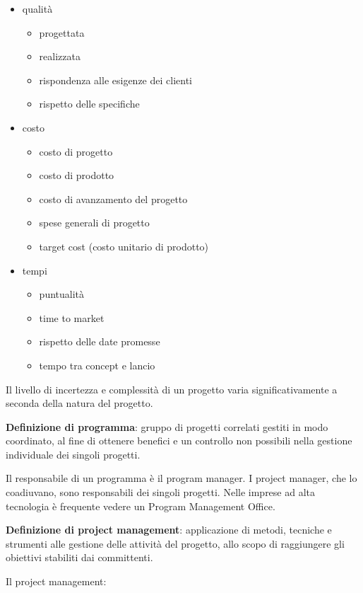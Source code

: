 \documentclass[answers, a4paper, 11pt]{exam}
\begin{document}
\begin{itemize}
    \item qualità
    \begin{itemize}
        \item progettata
        \item realizzata
        \item rispondenza alle esigenze dei clienti
        \item rispetto delle specifiche
    \end{itemize}
    \item costo
    \begin{itemize}
        \item costo di progetto
        \item costo di prodotto
        \item costo di avanzamento del progetto
        \item spese generali di progetto
        \item target cost (costo unitario di prodotto)
    \end{itemize}
    \item tempi
    \begin{itemize}
        \item puntualità
        \item time to market
        \item rispetto delle date promesse
        \item tempo tra concept e lancio
    \end{itemize}
\end{itemize}

Il livello di incertezza e complessità di un progetto varia significativamente a seconda della natura del progetto.

\textbf{Definizione di programma}: gruppo di progetti correlati gestiti in modo coordinato, al fine di ottenere benefici e un controllo non possibili nella gestione individuale dei singoli progetti.

Il responsabile di un programma è il program manager.
I project manager, che lo coadiuvano, sono responsabili dei singoli progetti.
Nelle imprese ad alta tecnologia è frequente vedere un Program Management Office. 

\textbf{Definizione di project management}: applicazione di metodi, tecniche e strumenti alle gestione delle attività del progetto, allo scopo di raggiungere gli obiettivi stabiliti dai committenti.

Il project management:
\end{document}
